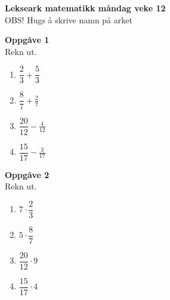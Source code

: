 


\huge \textbf{Lekseark matematikk måndag veke 12}\\
\footnotesize OBS! Hugs å skrive namn på arket \\[25pt]
\large

{\Large \textbf{Oppgåve 1}}\\[10pt]
Rekn ut. \\[10pt]
\vspace{12pt}
\begin{enumerate}[label=\alph*)]
	\item $\displaystyle \dfrac{2}{3}+\dfrac{5}{3} $\\[10pt]
	\item $\displaystyle \dfrac{8}{7}+\frac{2}{7} $\\[10pt]
	\item $\displaystyle \dfrac{20}{12}-\frac{4}{12} $\\[10pt]
	\item $\displaystyle \dfrac{15}{17}-\frac{3}{17}$\\[10pt]	
\end{enumerate} \vspace{20pt}

{\Large \textbf{Oppgåve 2}}\\[10pt]
Rekn ut. \\[10pt]
\vspace{12pt}
\begin{enumerate}[label=\alph*)]
	\item $\displaystyle 7\cdot\dfrac{2}{3} $\\[10pt]
	\item $\displaystyle 5\cdot\dfrac{8}{7}$\\[10pt]
	\item $\displaystyle \dfrac{20}{12}\cdot9 $\\[10pt]
	\item $\displaystyle \dfrac{15}{17}\cdot4$\\[10pt]	
\end{enumerate}
\newpage

